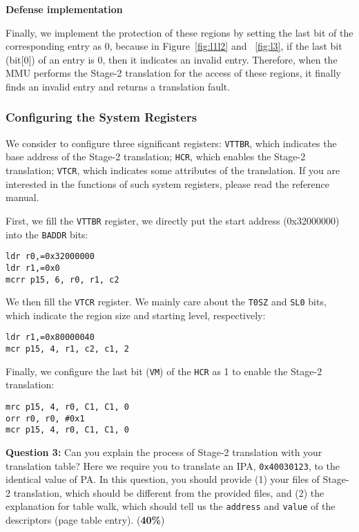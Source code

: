 \vspace{10pt}
\textbf{Defense implementation}
\vspace{10pt}



Finally, we implement the protection of these regions by setting the last bit of the corresponding entry as 0, because in Figure~\ref{fig:l1l2} and ~\ref{fig:l3}, if the last bit (bit[0]) of an entry is 0, then it indicates an invalid entry. Therefore, when the MMU performs the Stage-2 translation for the access of these regions, it finally finds an invalid entry and returns a translation fault.

\subsubsection{Configuring the System Registers}
We consider to configure three significant registers: \texttt{VTTBR}, which indicates the base address of the Stage-2 translation; \texttt{HCR}, which enables the Stage-2 translation; \texttt{VTCR}, which indicates some attributes of the translation. If you are interested in the functions of such system registers, please read the reference manual.

First, we fill the \texttt{VTTBR} register, we directly put the start address (0x32000000) into the \texttt{BADDR} bits:

\begin{lstlisting}
ldr r0,=0x32000000
ldr r1,=0x0
mcrr p15, 6, r0, r1, c2
\end{lstlisting}


We then fill the \texttt{VTCR} register. We mainly care about the \texttt{T0SZ} and \texttt{SL0} bits, which indicate the region size and starting level, respectively:

\begin{lstlisting}
ldr r1,=0x80000040
mcr p15, 4, r1, c2, c1, 2
\end{lstlisting}

Finally, we configure the last bit (\texttt{VM}) of the \texttt{HCR} as 1 to enable the Stage-2 translation:

\begin{lstlisting}
mrc p15, 4, r0, C1, C1, 0 
orr	r0, r0, #0x1
mcr p15, 4, r0, C1, C1, 0
\end{lstlisting}

\textbf{Question 3:} Can you explain the process of Stage-2 translation with your translation table? Here we require you to translate an IPA, \texttt{0x40030123}, to the identical value of PA. 
In this question, you should provide (1) your files of Stage-2 translation, which should be different from the provided files, and (2) the explanation for table walk, which should tell us the \texttt{address} and \texttt{value} of the descriptors (page table entry). (\textbf{40\%})



